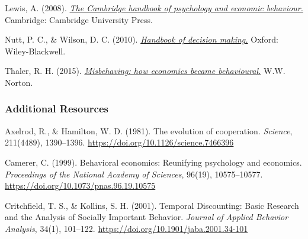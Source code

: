 \documentclass[
  x11names]{article}
\begin{document}
Lewis, A. (2008).
\href{https://uol.primo.exlibrisgroup.com/discovery/fulldisplay?docid=alma991003792192903496&context=L&vid=353UOL_INST:353UOL_VU1&lang=en&search_scope=MyInst_and_CI&adaptor=Local\%20Search\%20Engine&tab=TAB1&query=any,contains,The\%20Cambridge\%20handbook\%20of\%20psychology\%20and\%20economic\%20behaviour.&sortby=rank&offset=0}{\color{blue}\emph{The
Cambridge handbook of psychology and economic behaviour.}\color{black}}
Cambridge: Cambridge University Press.

Nutt, P. C., \& Wilson, D. C. (2010).
\href{https://uol.primo.exlibrisgroup.com/discovery/fulldisplay?docid=alma991001512319703496&context=L&vid=353UOL_INST:353UOL_VU1&lang=en&search_scope=MyInst_and_CI&adaptor=Local\%20Search\%20Engine&tab=TAB1&query=any,contains,Handbook\%20of\%20decision\%20making.&sortby=rank&offset=0}{\color{blue}\emph{Handbook
of decision making.}\color{black}} Oxford: Wiley-Blackwell.

Thaler, R. H. (2015).
\href{https://uol.primo.exlibrisgroup.com/discovery/fulldisplay?docid=alma991003236569703496&context=L&vid=353UOL_INST:353UOL_VU1&lang=en&search_scope=MyInst_and_CI&adaptor=Local\%20Search\%20Engine&tab=TAB1&query=any,contains,Misbehaving:\%20The\%20Making\%20of\%20Behavioral\%20Economics.&sortby=rank&offset=0}{\color{blue}\emph{Misbehaving:
how economics became behavioural.\color{black}}} W.W. Norton.

\setlength{\leftskip}{0in}

\subsubsection{Additional Resources}\label{additional-resources}

\noindent \vspace{-2em} \setlength{\parindent}{-0.5in}
\setlength{\leftskip}{0.5in} \setlength{\parskip}{7.5pt}

Axelrod, R., \& Hamilton, W. D. (1981). The evolution of cooperation.
\emph{Science}, 211(4489), 1390--1396. \color{blue}
\url{https://doi.org/10.1126/science.7466396} \color{black}

Camerer, C. (1999). Behavioral economics: Reunifying psychology and
economics. \emph{Proceedings of the National Academy of Sciences},
96(19), 10575--10577. \color{blue}
\url{https://doi.org/10.1073/pnas.96.19.10575} \color{black}

Critchfield, T. S., \& Kollins, S. H. (2001). Temporal Discounting:
Basic Research and the Analysis of Socially Important Behavior.
\emph{Journal of Applied Behavior Analysis}, 34(1), 101--122.
\color{blue} \url{https://doi.org/10.1901/jaba.2001.34-101}
\color{black}
\end{document}
